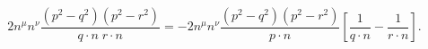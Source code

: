 \begin{equation}
2n^\mu n^\nu \frac{(p^2-q^2)(p^2-r^2)}{q\cdot n\;r\cdot n}=-2n^\mu n^\nu \frac{(p^2-q^2)(p^2-r^2)}{p\cdot n}\left[\frac{1}{q\cdot n}-\frac{1}{r\cdot n}\right].
\end{equation}


